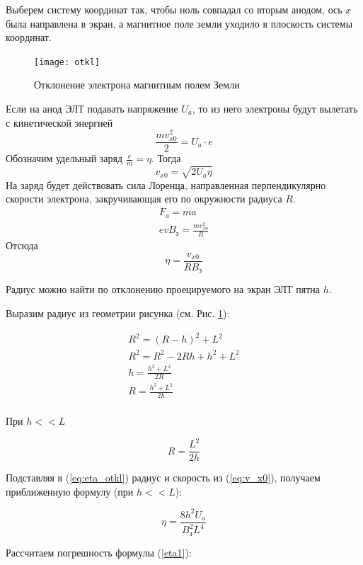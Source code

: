 Выберем систему координат так, чтобы ноль совпадал со вторым анодом, ось $x$ была направлена в экран, а магнитное поле земли уходило в плоскость системы координат.

\begin{figure}[ht!]
	\centering
	\texttt{[image: otkl]}
	\caption{Отклонение электрона магнитным полем Земли}
	\label{fig:otkl}
\end{figure}

Если на анод ЭЛТ подавать напряжение $U_a$, то из него электроны будут вылетать с кинетической энергией 
$$\frac{mv_{x0}^2}{2}=U_a\cdot{}e$$
Обозначим удельный заряд $\frac{e}{m}=\eta$. Тогда 
\begin{equation}
	v_{x0}=\sqrt{2U_a\eta}
	\label{eq:v_x0}
\end{equation}
%
На заряд будет действовать сила Лоренца, направленная перпендикулярно скорости электрона, закручивающая его по окружности радиуса $R$.
%
\begin{gather}
F_\text{л}=ma\\
evB_\text{з}=\frac{mv_{x0}^2}{R}
\end{gather}
%
Отсюда
%
\begin{equation}
	\eta=\frac{v_{x0}}{RB_\text{з}}
	\label{eq:eta_otkl}
\end{equation}

Радиус можно найти по отклонению проецируемого на экран ЭЛТ пятна $h$. 

Выразим радиус из геометрии рисунка (см. Рис. \ref{fig:otkl}):

\begin{gather}
	R^2=(R-h)^2+L^2\\
	R^2=R^2-2Rh+h^2+L^2\\
	h=\frac{h^2+L^2}{2R}\\
	R=\frac{h^2+L^2}{2h}\\
\end{gather}

При $h<<L$

\begin{equation}
	R=\frac{L^2}{2h}
\end{equation}

Подставляя в (\ref{eq:eta_otkl}) радиус и скорость из (\ref{eq:v_x0}), получаем  приближенную формулу (при $h<<L$):

\begin{equation}
	\eta=\frac{8h^2U_a}{B_\text{з}^2L^4}	
	\label{eta1}
\end{equation}

Рассчитаем погрешность формулы (\ref{eta1}):

